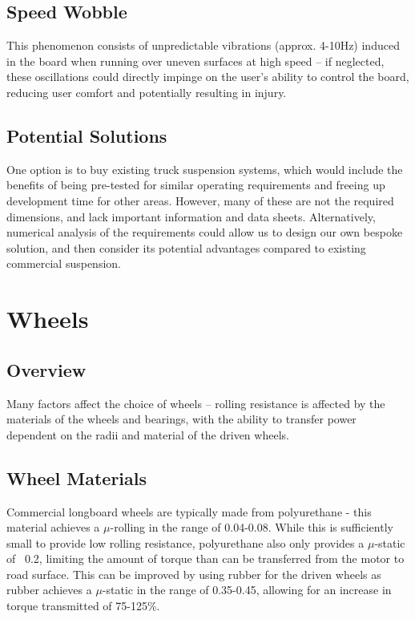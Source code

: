 \documentclass[journal,10pt]{IEEEtran}
\begin{document}
    \subsection{Speed Wobble}
        This phenomenon consists of unpredictable vibrations (approx. 4-10Hz) induced in the board when running over uneven surfaces at high speed – if neglected, these oscillations could directly impinge on the user’s ability to control the board, reducing user comfort and potentially resulting in injury. 
    \subsection{Potential Solutions}
        One option is to buy existing truck suspension systems, which would include the benefits of being pre-tested for similar operating requirements and freeing up development time for other areas. However, many of these are not the required dimensions, and lack important information and data sheets. Alternatively, numerical analysis of the requirements could allow us to design our own bespoke solution, and then consider its potential advantages compared to existing commercial suspension. 
\section{Wheels}
    \subsection{Overview}
        Many factors affect the choice of wheels – rolling resistance is affected by the materials of the wheels and bearings, with the ability to transfer power dependent on the radii and material of the driven wheels.
    \subsection{Wheel Materials}
        Commercial longboard wheels are typically made from polyurethane - this material achieves a $\mu$-rolling in the range of 0.04-0.08. While this is sufficiently small to provide low rolling resistance, polyurethane also only provides a $\mu$-static of ~0.2, limiting the amount of torque than can be transferred from the motor to road surface. This can be improved by using rubber for the driven wheels as rubber achieves a $\mu$-static in the range of 0.35-0.45, allowing for an increase in torque transmitted of 75-125\%.
\end{document}
